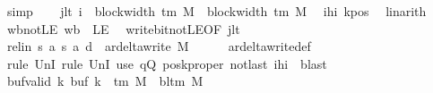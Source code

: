 \begin{isabellebody}
\ simp\isanewline
\ \ \isamarkupfalse%
\ jlt{\isacharcolon}{\kern0pt}\ {\isachardoublequoteopen}i\ {\isacharminus}{\kern0pt}\ block{\isacharunderscore}{\kern0pt}width\ {\isacharparenleft}{\kern0pt}{\isasymGamma}{\isacharunderscore}{\kern0pt}tm\ M{\isacharparenright}{\kern0pt}\ {\isacharless}{\kern0pt}\ block{\isacharunderscore}{\kern0pt}width\ {\isacharparenleft}{\kern0pt}{\isasymGamma}{\isacharunderscore}{\kern0pt}tm\ M{\isacharparenright}{\kern0pt}{\isachardoublequoteclose}\ \isamarkupfalse%
\ ihi\ kpos\ \isamarkupfalse%
\ linarith\isanewline
\ \ \isamarkupfalse%
\ wb{\isacharunderscore}{\kern0pt}not{\isacharunderscore}{\kern0pt}LE{\isacharcolon}{\kern0pt}\ {\isachardoublequoteopen}{\isacharquery}{\kern0pt}wb\ {\isasymnoteq}\ LE{}{\isachardoublequoteclose}\ \isamarkupfalse%
\ write{\isacharunderscore}{\kern0pt}bit{\isacharunderscore}{\kern0pt}not{\isacharunderscore}{\kern0pt}LE{}{\isacharbrackleft}{\kern0pt}OF\ jlt{\isacharbrackright}{\kern0pt}\ \isakeywordONE{{\isachardot}{\kern0pt}}\isamarkupfalse%
\isanewline
\ \ \isamarkupfalse%
\ rel{\isacharunderscore}{\kern0pt}in{\isacharcolon}{\kern0pt}\ {\isachardoublequoteopen}{\isacharparenleft}{\kern0pt}{\isacharquery}{\kern0pt}s{\isacharcomma}{\kern0pt}\ {\isacharquery}{\kern0pt}a{\isacharcomma}{\kern0pt}\ {\isacharquery}{\kern0pt}s{\isacharprime}{\kern0pt}{\isacharcomma}{\kern0pt}\ {\isacharquery}{\kern0pt}a{\isacharprime}{\kern0pt}{\isacharcomma}{\kern0pt}\ {\isacharquery}{\kern0pt}d{\isacharparenright}{\kern0pt}\ {\isasymin}\ ar{\isacharunderscore}{\kern0pt}delta{\isacharunderscore}{\kern0pt}write\ M{\isachardoublequoteclose}\isanewline
\ \ \ \ \isamarkupfalse%
\ ar{\isacharunderscore}{\kern0pt}delta{\isacharunderscore}{\kern0pt}write{\isacharunderscore}{\kern0pt}def\isanewline
\ \ \ \ \isamarkupfalse%
\ {\isacharparenleft}{\kern0pt}rule\ UnI{}{\isacharcomma}{\kern0pt}\ rule\ UnI{}{\isacharparenright}{\kern0pt}\ {\isacharparenleft}{\kern0pt}use\ qQ\ poskproper\ notlast\ ihi\ \ blast{\isacharparenright}{\kern0pt}\isanewline
\ \ \isamarkupfalse%
\ buf{\isacharunderscore}{\kern0pt}valid{\isacharcolon}{\kern0pt}\ {\isachardoublequoteopen}{\isasymforall}k{\isachardot}{\kern0pt}\ buf\ k\ {\isasymin}\ {\isasymGamma}{\isacharunderscore}{\kern0pt}tm\ M\ {\isasymunion}\ {\isacharbraceleft}{\kern0pt}bl{\isacharunderscore}{\kern0pt}tm\ M{\isacharbraceright}{\kern0pt}{\isachardoublequoteclose}\isanewline

\end{isabellebody}
